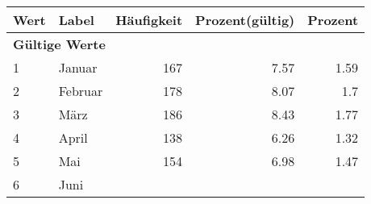      \begin{longtable}{lXrrr}
     \toprule
     \textbf{Wert} & \textbf{Label} & \textbf{Häufigkeit} & \textbf{Prozent(gültig)} & \textbf{Prozent} \\
     \endhead
     \midrule
     \multicolumn{5}{l}{\textbf{Gültige Werte}}\\

     1 &
     \multicolumn{1}{X}{ Januar   } &


       \num{167} &
       \num[round-mode=places,round-precision=2]{7.57} &
         \num[round-mode=places,round-precision=2]{1.59} \\

     2 &
     \multicolumn{1}{X}{ Februar   } &


       \num{178} &
       \num[round-mode=places,round-precision=2]{8.07} &
         \num[round-mode=places,round-precision=2]{1.7} \\

     3 &
     \multicolumn{1}{X}{ März   } &


       \num{186} &
       \num[round-mode=places,round-precision=2]{8.43} &
         \num[round-mode=places,round-precision=2]{1.77} \\

     4 &
     \multicolumn{1}{X}{ April   } &


       \num{138} &
       \num[round-mode=places,round-precision=2]{6.26} &
         \num[round-mode=places,round-precision=2]{1.32} \\

     5 &
     \multicolumn{1}{X}{ Mai   } &


       \num{154} &
       \num[round-mode=places,round-precision=2]{6.98} &
         \num[round-mode=places,round-precision=2]{1.47} \\

     6 &
     \multicolumn{1}{X}{ Juni   } &



\end{longtable}

